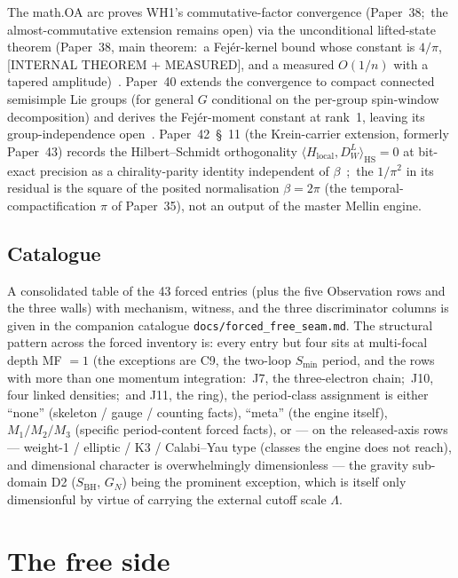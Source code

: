 \documentclass[11pt,a4paper]{article}
\theoremstyle{plain}
\theoremstyle{definition}
\begin{document}
The math.OA arc proves WH1's commutative-factor convergence (Paper~38;\ the almost-commutative extension remains open) via the unconditional lifted-state theorem (Paper~38, main theorem:\ a Fej\'er-kernel bound whose constant is $4/\pi$, [INTERNAL THEOREM + MEASURED], and a measured $O(1/n)$ with a tapered amplitude)~\cite{paper38}. Paper~40 extends the convergence to compact connected semisimple Lie groups (for general $G$ conditional on the per-group spin-window decomposition) and derives the Fej\'er-moment constant at rank~1, leaving its group-independence open~\cite{paper40}. Paper~42~\S~11 (the Krein-carrier extension, formerly Paper~43) records the Hilbert--Schmidt orthogonality $\langle H_{\mathrm{local}}, D_W^L \rangle_{\mathrm{HS}} = 0$ at bit-exact precision as a chirality-parity identity independent of $\beta$~\cite{paper42};\ the $1/\pi^2$ in its residual is the square of the posited normalisation $\beta = 2\pi$ (the temporal-compactification $\pi$ of Paper~35), not an output of the master Mellin engine.

\subsection{Catalogue}
\label{sec:forced_catalogue}

A consolidated table of the 43 forced entries (plus the five Observation rows and the three walls) with mechanism, witness, and the three discriminator columns is given in the companion catalogue \texttt{docs/forced\_free\_seam.md}. The structural pattern across the forced inventory is:  every entry but four sits at multi-focal depth MF $= 1$ (the exceptions are C9, the two-loop $S_{\min}$ period, and the rows with more than one momentum integration:\ J7, the three-electron chain;\ J10, four linked densities;\ and J11, the ring), the period-class assignment is either ``none'' (skeleton / gauge / counting facts), ``meta'' (the engine itself), $M_1 / M_2 / M_3$ (specific period-content forced facts), or --- on the released-axis rows --- weight-1 / elliptic / K3 / Calabi--Yau type (classes the engine does not reach), and dimensional character is overwhelmingly dimensionless --- the gravity sub-domain D2 ($S_{\mathrm{BH}}$, $G_N$) being the prominent exception, which is itself only dimensionful by virtue of carrying the external cutoff scale $\Lambda$.

\section{The free side}
\label{sec:free}
\end{document}
